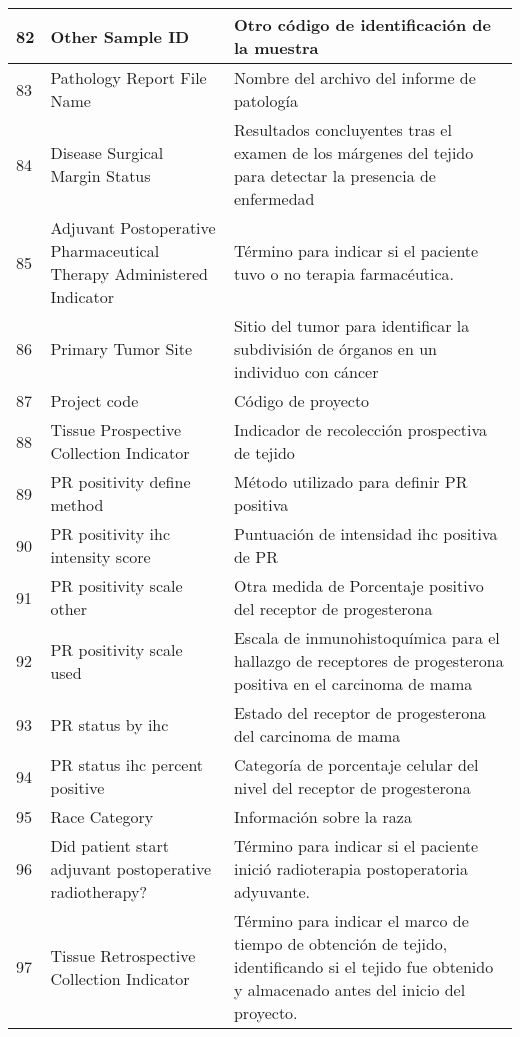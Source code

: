 \begin{table*} [!htb]
	\footnotesize
	\begin{threeparttable}
		\begin{tabular}{p{1cm} p{4cm} p{10cm}}
			\\ \hline	82	&	Other Sample ID	&	Otro código de identificación de la muestra
			\\ \hline	83	&	Pathology Report File Name	&	Nombre del archivo del informe de patología
			\\ \hline	84	&	Disease Surgical Margin Status	&	Resultados concluyentes tras el examen de los márgenes del tejido para detectar la presencia de enfermedad
			\\ \hline	85	&	Adjuvant Postoperative Pharmaceutical Therapy Administered Indicator	&	Término para indicar si el paciente tuvo o no terapia farmacéutica.
			\\ \hline	86	&	Primary Tumor Site	&	Sitio del tumor para identificar la subdivisión de órganos en un individuo con cáncer
			\\ \hline	87	&	Project code	&	Código de proyecto
			\\ \hline	88	&	Tissue Prospective Collection Indicator	&	Indicador de recolección prospectiva de tejido
			\\ \hline	89	&	PR positivity define method	&	Método utilizado para definir PR positiva
			\\ \hline	90	&	PR positivity ihc intensity score	&	Puntuación de intensidad ihc positiva de PR
			\\ \hline	91	&	PR positivity scale other	&	Otra medida de Porcentaje positivo del receptor de progesterona
			\\ \hline	92	&	PR positivity scale used	&	Escala de inmunohistoquímica para el hallazgo de receptores de progesterona positiva en el  carcinoma de mama
			\\ \hline	93	&	PR status by ihc	&	Estado del receptor de progesterona del carcinoma de mama
			\\ \hline	94	&	PR status ihc percent positive	&	Categoría de porcentaje celular del nivel del receptor de progesterona
			\\ \hline	95	&	Race Category	&	Información sobre la raza
			\\ \hline	96	&	Did patient start adjuvant postoperative radiotherapy?	&	Término para indicar si el paciente inició radioterapia postoperatoria adyuvante.
			\\ \hline	97	&	Tissue Retrospective Collection Indicator	&	Término para indicar el marco de tiempo de obtención de tejido, identificando si el tejido fue obtenido y almacenado antes del inicio del proyecto.

\end{tabular}
\end{threeparttable}
\end{table*}
